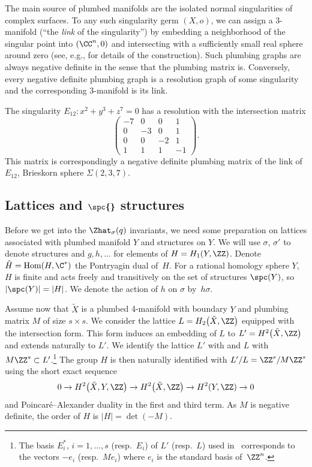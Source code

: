 \documentclass[10pt,a4paper]{amsart}
\begin{document}
The main source of plumbed manifolds are the isolated normal singularities of complex surfaces. To any such singularity germ $(X, o)$, we can assign a 3-manifold (``the \emph{link} of the singularity'') by embedding a neighborhood of the singular point into $(\CC^n, 0)$ and intersecting with a sufficiently small real sphere around zero (see, e.g., \cite{Nem22} for details of the construction). Such plumbing graphs are always negative definite in the sense that the plumbing matrix is. Conversely, every negative definite plumbing graph is a resolution graph of some singularity and the corresponding 3-manifold is its link.

\begin{Example}
	The singularity $E_{12}\colon x^2+y^3+z^7 = 0$ has a resolution with the intersection matrix
	\[
		\begin{pmatrix}
				-7 & 0 & 0 & 1 \\
				0 & -3 & 0 & 1 \\
				0 & 0 & -2 & 1 \\
				1 & 1 & 1 & -1
			\end{pmatrix}.
	\]
	This matrix is correspondingly a negative definite plumbing matrix of the link of $E_{12}$, Brieskorn sphere $\Sigma(2, 3, 7)$.
\end{Example}

\subsection[Lattices and spinc structures]{Lattices and $\boldsymbol{\spc{}}$ structures}\label{spc_structures}

Before we get into the $\Zhat_{\sigma} (q)$ invariants, we need some preparation on lattices associated with plumbed manifold $Y$ and \spc{} structures on $Y$. We will use $\sigma$, $\sigma'$ to denote \spc{} structures and $g, h, \dots$ for elements of $H = H_1(Y, \ZZ)$. Denote $\hat{H} = \operatorname{Hom}(H, \C^*)$ the Pontryagin dual of~$H$. For a rational homology sphere $Y$, $H$ is finite and acts freely and transitively on the set of \spc{} structures $\spc(Y)$, so $|\spc(Y)| = |H|$. We denote the action of $h$ on $\sigma$ by~$h\sigma$.

Assume now that $\tilde{X}$ is a plumbed 4-manifold with boundary $Y$ and plumbing matrix $M$ of size $s \times s$. We consider the lattice $L = H_2\bigl(\tilde{X}, \ZZ\bigr)$ equipped with the intersection form. This form induces an embedding of $L$ to $L' = H^2\bigl(\tilde{X}, \ZZ\bigr)$ and extends naturally to $L'$. We identify the lattice $L'$ with  and $L$ with $M\ZZ^s \subset L'$.\footnote{The basis $E^*_i$, $i = 1, \dots, s$ (resp.\ $E_i$) of $L'$ (resp.\ $L$) used in~\cite{Nem22} corresponds to the vectors $-e_i$ (resp.\ $M e_i$) where $e_i$ is the standard basis of~$\ZZ^n$.}
%
The group $H$ is then naturally identified with $L'/L = \ZZ^s/M \ZZ^s$ using the short exact sequence
\[
	0 \rightarrow H^2\bigl(\tilde{X}, Y, \ZZ\bigr) \rightarrow H^2\bigl(\tilde{X}, \ZZ\bigr) \rightarrow H^2(Y, \ZZ) \rightarrow 0
\]
and Poincar\'e--Alexander duality in the first and third term. As $M$ is negative definite, the order of $H$ is $|H|=\det(-M)$.
\end{document}
